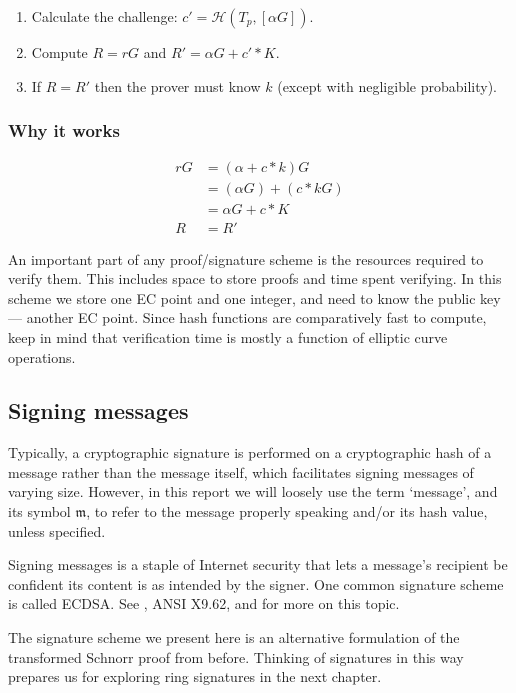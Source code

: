 \begin{enumerate}
	\item Calculate the challenge: \(c' = \mathcal{H}(T_p, [\alpha G])\).
	\item Compute $R = r G$ and $R' = \alpha G + c'*K$.
	\item If $R = R'$ then the prover must know $k$ (except with negligible probability).
\end{enumerate}

\subsubsection*{Why it works}

\begin{align*}
r G &= (\alpha + c*k) G \\
	&= (\alpha G) + (c*k G) \\
	&= \alpha G + c*K \\
  R &= R'
\end{align*}

An important part of any proof/signature scheme is the resources required to verify them. This includes space to store proofs and time spent verifying. In this scheme we store one EC point and one integer, and need to know the public key --- another EC point. Since hash functions are comparatively fast to compute, keep in mind that verification time is mostly a function of elliptic curve operations.


\subsection{Signing messages}
\label{sec:signing-messages}

Typically, a cryptographic signature is performed on a cryptographic hash of a message rather than the message itself, which facilitates signing messages of varying size. However, in this report we will loosely use the term `message', and its symbol $\mathfrak{m}$, to refer to the message properly speaking and/or its hash value, unless specified.

Signing messages is a staple of Internet security that lets a message's recipient be confident its content is as intended by the signer. One common signature scheme is called ECDSA. See \cite{ecdsa}, ANSI X9.62, and \cite{Hankerson:2003:GEC:940321} for more on this topic.

The signature scheme we present here is an alternative formulation of the transformed Schnorr proof from before. Thinking of signatures in this way prepares us for exploring ring signatures in the next chapter.

